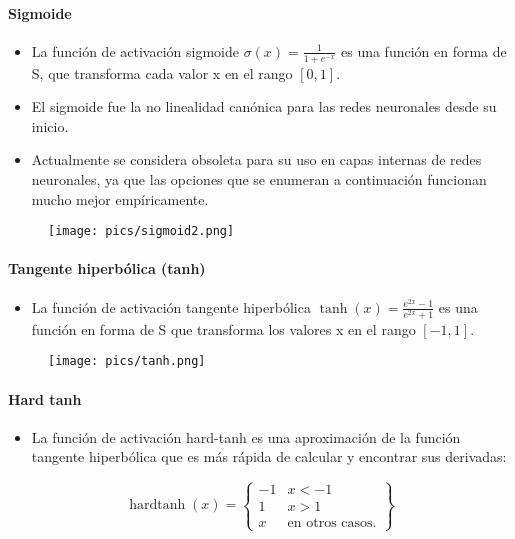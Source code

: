 \paragraph{Sigmoide}
\begin{itemize}
\item La función de activación sigmoide $\sigma(x) = \frac{1}{1+e^{-x}}$ es una función en forma de S, que transforma cada valor x en el rango $[0, 1]$.
\item El sigmoide fue la no linealidad canónica para las redes neuronales desde su inicio.
\item Actualmente se considera obsoleta para su uso en capas internas de redes neuronales, ya que las opciones que se enumeran a continuación funcionan mucho mejor empíricamente.
\end{itemize}

\begin{figure}[htb]
	\centering
	 \texttt{[image: pics/sigmoid2.png]}
\end{figure}

\paragraph{Tangente hiperbólica (tanh)}
\begin{itemize}
\item La función de activación tangente hiperbólica $\operatorname{tanh}(x) = \frac{e^{2x}-1}{e^{2x}+1}$ es una función en forma de S que transforma los valores x en el rango $[-1, 1]$.
\end{itemize}

\begin{figure}[htb]
	\centering
	 \texttt{[image: pics/tanh.png]}
\end{figure}

\paragraph{Hard tanh}
\begin{itemize}
\item La función de activación hard-tanh es una aproximación de la función tangente hiperbólica que es más rápida de calcular y encontrar sus derivadas:
\end{itemize}

  \[
    \operatorname{hardtanh}(x) = \left\{\begin{array}{lr}
        -1 & x < -1\\
        1 & x > 1\\
        x & \text{en otros casos.}
        \end{array} \right\}
  \]

